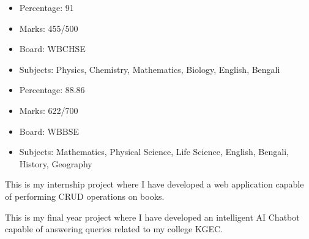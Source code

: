 \documentclass[10pt,legalpaper,ragged2e,withhyper]{debjitpalcv}
\begin{document}
\begin{paracol}{2}
    \begin{minipage}[t]{0.2\textwidth}
        \begin{itemize}
            \item Percentage: 91
            \item Marks: 455/500
        \end{itemize}
    \end{minipage}
    \begin{minipage}[t]{0.4\textwidth}
        \begin{itemize}
            \item Board: WBCHSE
            \item Subjects: Physics, Chemistry, Mathematics, Biology, English, Bengali
        \end{itemize}
    \end{minipage}

    \divider
    \begin{minipage}[t]{0.2\textwidth}
        \begin{itemize}
            \item Percentage: 88.86
            \item Marks: 622/700
        \end{itemize}
    \end{minipage}
    \begin{minipage}[t]{0.4\textwidth}
        \begin{itemize}
            \item Board: WBBSE
            \item Subjects: Mathematics, Physical Science, Life Science, English, Bengali, History, Geography
        \end{itemize}
    \end{minipage}


    This is my internship project where I have developed a web application capable of performing CRUD operations on books.
    \divider

    This is my final year project where I have developed an intelligent AI Chatbot capable of answering queries related to my college KGEC.

\end{paracol}
\end{document}
